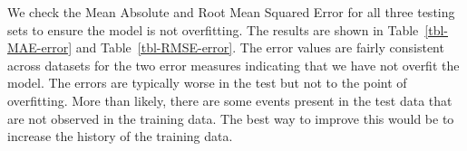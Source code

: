 \documentclass[
  journal,
]{IEEEtran}%
\begin{document}
We check the Mean Absolute and Root Mean Squared Error for all three
testing sets to ensure the model is not overfitting. The results are
shown in Table~\ref{tbl-MAE-error} and Table~\ref{tbl-RMSE-error}. The
error values are fairly consistent across datasets for the two error
measures indicating that we have not overfit the model. The errors are
typically worse in the test but not to the point of overfitting. More
than likely, there are some events present in the test data that are not
observed in the training data. The best way to improve this would be to
increase the history of the training data.

\begin{table}

\caption{\label{tbl-MAE-error}Mean Absolute Error}


\end{table}%

\begin{table}

\caption{\label{tbl-RMSE-error}Root Mean Square Error}


\end{table}%
\end{document}
